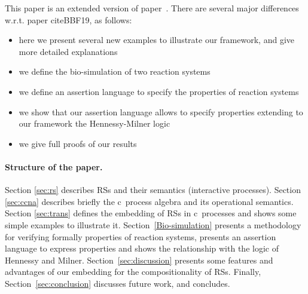 This paper is an extended version of paper~\cite{BBF19}.
There are several major differences w.r.t. paper cite{BBF19}, as follows:
\begin{itemize}
\item here we present several new examples to illustrate our framework,
and give more detailed explanations
\item we define the bio-simulation of two reaction systems
\item we define an assertion language to specify the properties of reaction systems
\item we show that our assertion language allows to specify properties extending to our
framework the Hennessy-Milner logic
\item we give full proofs of our results
\end{itemize}
 
\paragraph{Structure of the paper.} Section \ref{sec:rs} 
describes RSs and their semantics (interactive processes).
Section \ref{sec:ccna} describes briefly the c\CNA \ process algebra and
its operational semantics.
Section \ref{sec:trans} defines the embedding of RSs in
c\CNA \ processes and shows some simple examples to illustrate 
it.
Section~\ref{Bio-simulation} presents a methodology for verifying formally
properties of reaction systems, presents an assertion language
to express properties and shows the relationship
with the logic of Hennessy and Milner.
Section~\ref{sec:discussion} presents some features and 
advantages of our embedding for the compositionality of RSs.
Finally, Section~\ref{sec:conclusion}
discusses future work, and concludes.


